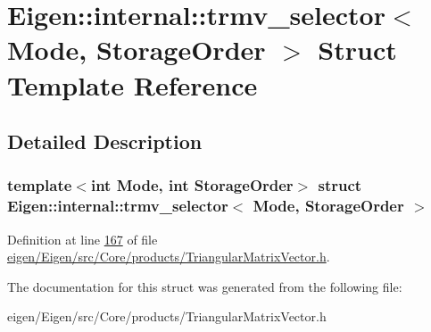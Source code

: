 \hypertarget{struct_eigen_1_1internal_1_1trmv__selector}{}\section{Eigen\+:\+:internal\+:\+:trmv\+\_\+selector$<$ Mode, Storage\+Order $>$ Struct Template Reference}
\label{struct_eigen_1_1internal_1_1trmv__selector}


\subsection{Detailed Description}
\subsubsection*{template$<$int Mode, int Storage\+Order$>$\newline
struct Eigen\+::internal\+::trmv\+\_\+selector$<$ Mode, Storage\+Order $>$}



Definition at line \hyperlink{eigen_2_eigen_2src_2_core_2products_2_triangular_matrix_vector_8h_source_l00167}{167} of file \hyperlink{eigen_2_eigen_2src_2_core_2products_2_triangular_matrix_vector_8h_source}{eigen/\+Eigen/src/\+Core/products/\+Triangular\+Matrix\+Vector.\+h}.



The documentation for this struct was generated from the following file\+:\begin{DoxyCompactItemize}
\item 
eigen/\+Eigen/src/\+Core/products/\+Triangular\+Matrix\+Vector.\+h\end{DoxyCompactItemize}
